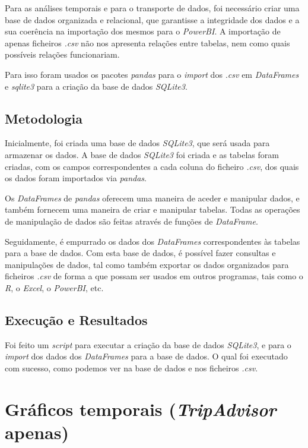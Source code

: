 Para as análises temporais e para o transporte de dados, foi necessário criar uma base de dados organizada e relacional, que garantisse a integridade dos dados e a sua coerência na importação dos mesmos para o \textit{PowerBI}. A importação de apenas ficheiros \textit{.csv} não nos apresenta relações entre tabelas, nem como quais possíveis relações funcionariam.

Para isso foram usados os pacotes \textit{pandas} para o \textit{import} dos \textit{.csv} em \textit{DataFrames} e \textit{sqlite3} para a criação da base de dados \textit{SQLite3}.

\subsection{Metodologia}

Inicialmente, foi criada uma base de dados \textit{SQLite3}, que será usada para armazenar os dados. A base de dados \textit{SQLite3} foi criada e as tabelas foram criadas, com os campos correspondentes a cada coluna do ficheiro \textit{.csv}, dos quais os dados foram importados via \textit{pandas}. 

Os \textit{DataFrames} de \textit{pandas} oferecem uma maneira de aceder e manipular dados, e também fornecem uma maneira de criar e manipular tabelas. Todas as operações de manipulação de dados são feitas através de funções de \textit{DataFrame}.

Seguidamente, é empurrado os dados dos \textit{DataFrames} correspondentes às tabelas para a base de dados. Com esta base de dados, é possível fazer consultas e manipulações de dados, tal como também exportar os dados organizados para ficheiros \textit{.csv} de forma a que possam ser usados em outros programas, tais como o \textit{R}, o \textit{Excel}, o \textit{PowerBI}, etc.

\subsection{Execução e Resultados}

Foi feito um \textit{script} para executar a criação da base de dados \textit{SQLite3}, e para o \textit{import} dos dados dos \textit{DataFrames} para a base de dados. O qual foi executado com sucesso, como podemos ver na base de dados e nos ficheiros \textit{.csv}.

\section{Gráficos temporais (\textit{TripAdvisor} apenas)}


